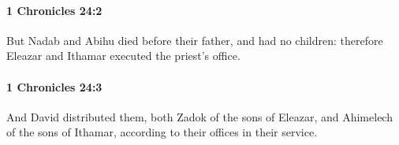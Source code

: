 		\paragraph{1 Chronicles 24:2} %
			\label{1CHRONICLES-24-2}

			But Nadab and Abihu died before their father, and had no children: therefore Eleazar and Ithamar executed the priest’s office.


		\paragraph{1 Chronicles 24:3} %
			\label{1CHRONICLES-24-3}

			And David distributed them, both Zadok of the sons of Eleazar, and Ahimelech of the sons of Ithamar, according to their offices in their service.


